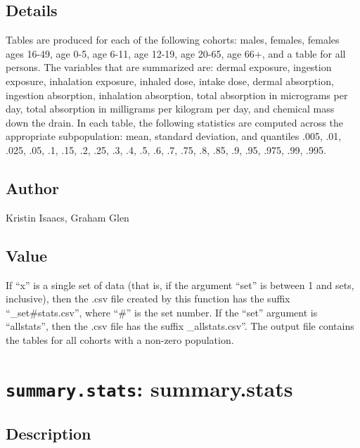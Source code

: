 \documentclass[
]{article}
\begin{document}
\hypertarget{details-29}{%
\subsection{Details}\label{details-29}}

Tables are produced for each of the following cohorts: males, females,
females ages 16-49, age 0-5, age 6-11, age 12-19, age 20-65, age 66+,
and a table for all persons. The variables that are summarized are:
dermal exposure, ingestion exposure, inhalation exposure, inhaled dose,
intake dose, dermal absorption, ingestion absorption, inhalation
absorption, total absorption in micrograms per day, total absorption in
milligrams per kilogram per day, and chemical mass down the drain. In
each table, the following statistics are computed across the appropriate
subpopulation: mean, standard deviation, and quantiles .005, .01, .025,
.05, .1, .15, .2, .25, .3, .4, .5, .6, .7, .75, .8, .85, .9, .95, .975,
.99, .995.

\hypertarget{author-32}{%
\subsection{Author}\label{author-32}}

Kristin Isaacs, Graham Glen

\hypertarget{value-35}{%
\subsection{Value}\label{value-35}}

If ``x'' is a single set of data (that is, if the argument ``set'' is
between 1 and sets, inclusive), then the .csv file created by this
function has the suffix ``\_set\#stats.csv'', where ``\#'' is the set
number. If the ``set'' argument is ``allstats'', then the .csv file has
the suffix \_allstats.csv''. The output file contains the tables for all
cohorts with a non-zero population.

\hypertarget{summary.stats-summary.stats}{%
\section{\texorpdfstring{\texttt{summary.stats}:
summary.stats}{summary.stats: summary.stats}}\label{summary.stats-summary.stats}}

\hypertarget{description-53}{%
\subsection{Description}\label{description-53}}
\end{document}
